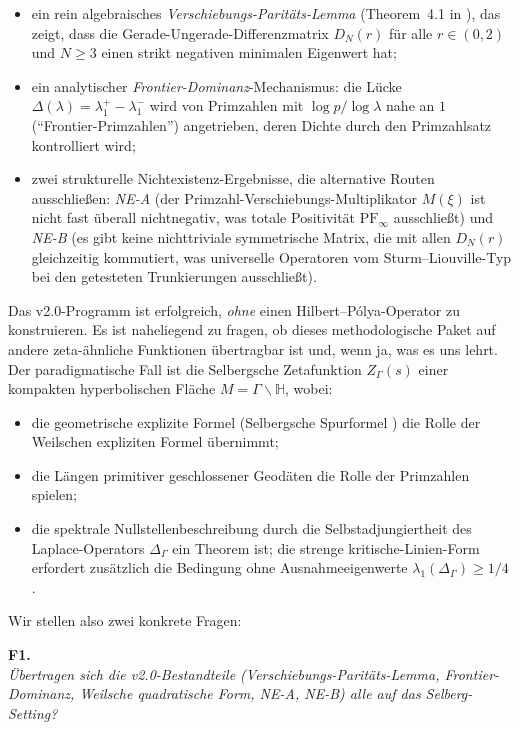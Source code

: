 \documentclass[12pt,a4paper]{article}
\theoremstyle{definition}
\theoremstyle{remark}
\newcommand{\HH}{\mathbb{H}}
\newcommand{\Sel}{Z_{\Gamma}}
\newcommand{\Delop}{\Delta_{\Gamma}}
\begin{document}
\begin{itemize}
\item ein rein algebraisches \emph{Verschiebungs-Paritäts-Lemma} (Theorem~4.1 in \cite{Geiger2026partII}),
das zeigt, dass die Gerade-Ungerade-Differenzmatrix $D_N(r)$ für alle $r \in (0,2)$ und $N \geq 3$ einen strikt negativen
minimalen Eigenwert hat;

\item ein analytischer \emph{Frontier-Dominanz}-Mechanismus: die Lücke
$\Delta(\lambda) = \lambda_1^+ - \lambda_1^-$ wird von Primzahlen mit
$\log p / \log\lambda$ nahe an $1$ (``Frontier-Primzahlen'') angetrieben, deren Dichte
durch den Primzahlsatz kontrolliert wird;

\item zwei strukturelle Nichtexistenz-Ergebnisse, die alternative Routen ausschließen:
\emph{NE-A} (der Primzahl-Verschiebungs-Multiplikator $M(\xi)$ ist nicht fast überall nichtnegativ,
was totale Positivität $\mathrm{PF}_\infty$ ausschließt) und \emph{NE-B} (es gibt keine nichttriviale
symmetrische Matrix, die mit allen $D_N(r)$ gleichzeitig kommutiert, was
universelle Operatoren vom Sturm--Liouville-Typ bei den getesteten Trunkierungen ausschließt).
\end{itemize}

Das v2.0-Programm ist erfolgreich, \emph{ohne} einen Hilbert--Pólya-Operator
zu konstruieren. Es ist naheliegend zu fragen, ob dieses methodologische Paket auf
andere zeta-ähnliche Funktionen übertragbar ist und, wenn ja, was es uns lehrt. Der paradigmatische
Fall ist die Selbergsche Zetafunktion $\Sel(s)$ einer kompakten hyperbolischen Fläche
$M = \Gamma\backslash\HH$, wobei:

\begin{itemize}
\item die geometrische explizite Formel (Selbergsche Spurformel \cite{Selberg1956})
die Rolle der Weilschen expliziten Formel \cite{Weil1952} übernimmt;
\item die Längen primitiver geschlossener Geodäten die Rolle der Primzahlen spielen;
\item die spektrale Nullstellenbeschreibung durch die Selbstadjungiertheit des
Laplace-Operators $\Delop$ ein Theorem ist; die strenge kritische-Linien-Form
erfordert zusätzlich die Bedingung ohne Ausnahmeeigenwerte
$\lambda_1(\Delop)\ge 1/4$.
\end{itemize}

Wir stellen also zwei konkrete Fragen:

\medskip
\noindent\textbf{F1.}\\
\emph{Übertragen sich die v2.0-Bestandteile
(Verschiebungs-Paritäts-Lemma, Frontier-Dominanz,
Weilsche quadratische Form, NE-A, NE-B)
alle auf das Selberg-Setting?}
\end{document}
